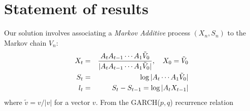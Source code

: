 \section{Statement of results}
\label{sec:IS_Results}
Our solution involves associating a {\em Markov Additive} process
$(X_n, S_n)$ to the Markov chain $V_n$:
\begin{eqnarray}
X_t &=& {
        A_t A_{t-1} \cdots A_1 \tilde V_0
        \over
        |A_t A_{t-1} \cdots A_1 \tilde V_0|
      }, \quad X_0 = \tilde V_0 \label{eq:X_def}\\
S_t &=& \log |A_t \cdots A_1 \tilde V_0| \label{eq:S_def}\\
l_t &=& S_t - S_{t-1} = \log |A_t X_{t-1}| \label{l_def}
\end{eqnarray}
where $\tilde v = v/|v|$  for a vector $v$. From the GARCH($p, q$)
recurrence relation
